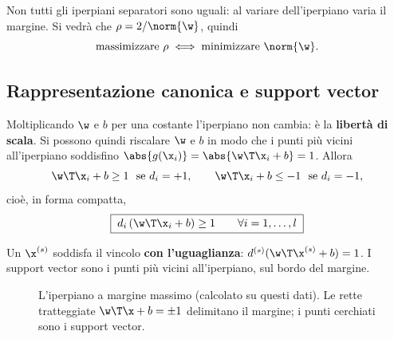 Non tutti gli iperpiani separatori sono uguali: al variare dell'iperpiano varia il margine. Si vedrà che
$\rho = 2/\norm{\w}$, quindi
\[
\text{massimizzare }\rho\iff\text{minimizzare }\norm{\w}.
\]

\subsection{Rappresentazione canonica e support vector}

Moltiplicando $\w$ e $b$ per una costante l'iperpiano non cambia: è la \textbf{libertà di scala}. Si possono
quindi riscalare $\w$ e $b$ in modo che i punti più vicini all'iperpiano soddisfino
$\abs{g(\x_i)} = \abs{\w\T\x_i+b} = 1$. Allora
\[
\w\T\x_i+b\ge1\ \text{ se } d_i=+1,\qquad \w\T\x_i+b\le-1\ \text{ se } d_i=-1,
\]
cioè, in forma compatta,
\begin{equation}\label{eq:vincoli-svm}
\boxed{\;d_i\,(\w\T\x_i+b)\ge1\qquad\forall i=1,\dots,l\;}
\end{equation}

\begin{definizione}
Un  $\x^{(s)}$ soddisfa il vincolo \textbf{con l'uguaglianza}:
$d^{(s)}(\w\T\x^{(s)}+b) = 1$. I support vector sono i punti più vicini all'iperpiano, sul bordo del margine.
\end{definizione}

\begin{figure}[ht]
\centering
{}
\caption{L'iperpiano a margine massimo (calcolato su questi dati). Le rette tratteggiate $\w\T\x+b=\pm1$ delimitano
il margine; i punti cerchiati sono i support vector.}
\label{fig:svm-margine}
\end{figure}


